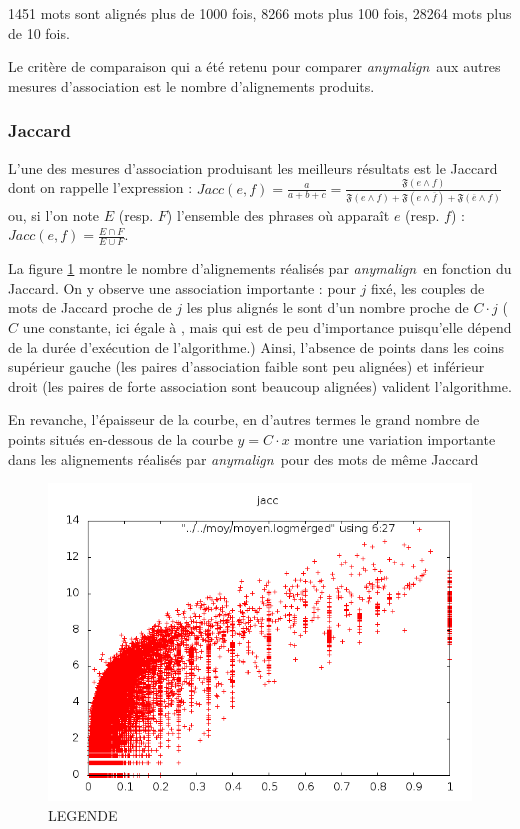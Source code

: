 \documentclass[a4paper,10pt]{article}
\newcommand{\anym}{\emph{anymalign}}
\begin{document}
1451 mots sont alignés plus de 1000 fois, 8266 mots plus 100 fois, 28264 mots plus de 10 fois.

Le critère de comparaison qui a été retenu pour comparer \anym~aux autres mesures d'association est le nombre d'alignements produits. %

\subsubsection{Jaccard}

L'une des mesures d'association produisant les meilleurs résultats est le Jaccard dont on rappelle l'expression : $Jacc(e,f)=\frac{a}{a+b+c}=\frac{\mathfrak{F}(e\wedge f)}{\mathfrak{F}(e\wedge f)+\mathfrak{F}(e\wedge\overline{f})+\mathfrak{F}(\overline{e}\wedge f)}$ ou, si l'on note $E$ (resp. $F$) l'ensemble des phrases où apparaît $e$ (resp. $f$) : $Jacc(e,f)=\frac{E\cap F}{E\cup F}$.

La figure \ref{jaccard} montre le nombre d'alignements %
 réalisés par \anym~en fonction du Jaccard. On y observe une association importante : 
pour $j$ fixé, les couples de mots de Jaccard proche de $j$ les plus alignés le sont d'un nombre proche de $C\cdot j$ ($C$ une constante, ici égale à %
, mais qui est de peu d'importance puisqu'elle dépend de la durée d'exécution de l'algorithme.) Ainsi, l'absence de points dans les coins supérieur gauche (les paires d'association faible sont peu alignées) et inférieur droit (les paires de forte association sont beaucoup alignées) valident l'algorithme.

En revanche, l'épaisseur de la courbe, en d'autres termes le grand nombre de points situés en-dessous de la courbe $y = C\cdot x$ montre une variation importante dans les alignements réalisés par \anym~pour des mots de même Jaccard

\begin{figure}[t]
\centering
\label{jaccard}
\includegraphics[width=12cm]{jacclog.png} %
\caption{LEGENDE} %
\end{figure}
\end{document}
